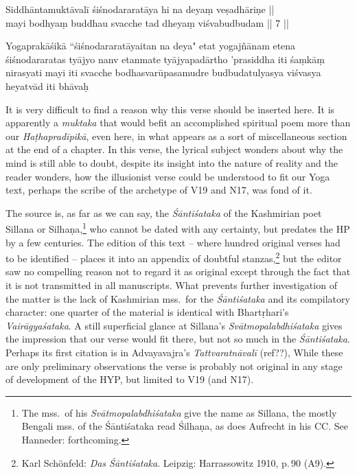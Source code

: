 \begin{ekdosis}
\begin{testimonia}[hp01_055_3]
Siddhāntamuktāvalī
\startverse
śiśnodararatāya hi na deyaṃ veṣadhāriṇe ||\\
mayi bodhyaṃ buddhau svacche tad dheyaṃ viśvabudbudam || 7 ||
\endverse

Yogaprakāśikā
\startverse
“śiśnodararatāyaitan na deya" etat yogajñānam etena śiśnodararatas tyājyo nanv etanmate tyājyapadārtho 'prasiddha iti śaṃkāṃ nirasyati mayi iti svacche bodhasvarūpasamudre budbudatulyasya viśvasya heyatvād iti bhāvaḥ
\endverse
\end{testimonia}

\begin{philcomm}[hp01_055_3]
It is very difficult to find a reason why this verse should be inserted here. It is apparently a
\emph{muktaka} that would befit an accomplished spiritual poem more than our \emph{Haṭhapradīpikā},
even here, in what appears as a sort of miscellaneous section at the end of a chapter.  In this
verse, the lyrical subject wonders about why the mind is still able to doubt, despite its insight
into the nature of reality and the reader wonders, how the illusionist verse could be understood to
fit our Yoga text, perhaps the scribe of the archetype of V19 and N17, was fond of it.

The source is, as far as we can say, the \emph{Śāntiśataka} of the Kashmirian poet Sillana or
Silhaṇa,\footnote{The mss.\ of his \emph{Svātmopalabdhiśataka} give the name as Sillana, the mostly
Bengali mss. of the Śāntiśataka read Śilhaṇa, as does Aufrecht in his CC. See Hanneder:
forthcoming.} who cannot be dated with any certainty, but predates the HP by a few centuries. The
edition of this text – where hundred original verses had to be identified – places it into an
appendix of doubtful stanzas,\footnote{Karl Schönfeld: \emph{Das Śāntiśataka}. Leipzig:
Harrassowitz 1910, p.\,90 (A9).} but the editor saw no compelling reason not to regard it as
original except through the fact that it is not transmitted in all manuscripts.  What prevents
further investigation of the matter is the lack of Kashmirian mss.\ for the \emph{Śāntiśataka} and
its compilatory character: one quarter of the material is identical with Bhartṛhari's
\emph{Vairāgyaśataka}. A still superficial glance at Sillana's \emph{Svātmopalabdhiśataka} gives
the impression that our verse would fit there, but not so much in the \emph{Śāntiśataka}. Perhaps its first citation is in Advayavajra’s \emph{Tattva\-ratnāvalī} (ref??),  While
these are only preliminary observations the verse is probably not original in any stage of
development of the HYP, but limited to V19 (and N17).
\end{philcomm}


\end{ekdosis}
